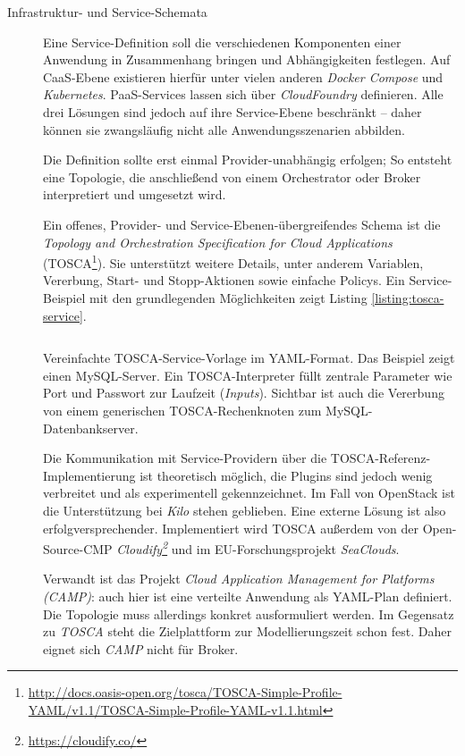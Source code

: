 \begin{description}
	\item[Infrastruktur- und Service-Schemata] Eine Service-Definition soll die verschiedenen Komponenten einer Anwendung in Zusammenhang bringen und Abhängigkeiten festlegen. Auf CaaS-Ebene existieren hierfür unter vielen anderen \emph{Docker Compose} und \emph{Kubernetes}. PaaS-Services lassen sich über \emph{CloudFoundry} definieren. Alle drei Lösungen sind jedoch auf ihre Service-Ebene beschränkt -- daher können sie zwangsläufig nicht alle Anwendungsszenarien abbilden.
	
	Die Definition sollte erst einmal Provider-unabhängig erfolgen; So entsteht eine Topologie, die anschließend von einem Orchestrator oder Broker interpretiert und umgesetzt wird.
	
	Ein offenes, Provider- und Service-Ebenen-übergreifendes Schema ist die \emph{Topology and Orchestration Specification for Cloud Applications} (TOSCA\footnote{\url{http://docs.oasis-open.org/tosca/TOSCA-Simple-Profile-YAML/v1.1/TOSCA-Simple-Profile-YAML-v1.1.html}}). Sie unterstützt	weitere Details, unter anderem Variablen, Vererbung, Start- und Stopp-Aktionen sowie einfache Policys. Ein Service-Beispiel mit den grundlegenden Möglichkeiten zeigt Listing \ref{listing:tosca-service}.
	
	
	\begin{listing}[]	
		\inputminted[]{yaml}{./src/TOSCA.service.sample.yaml}
		\caption{Vereinfachte TOSCA-Service-Vorlage im YAML-Format. Das Beispiel zeigt einen MySQL-Server. Ein TOSCA-Interpreter füllt zentrale Parameter wie Port und Passwort zur Laufzeit (\emph{Inputs}). Sichtbar ist auch die Vererbung von einem generischen TOSCA-Rechenknoten zum MySQL-Datenbankserver.}
		\label{listing:tosca-service}
	\end{listing}
	
	Die Kommunikation mit Service-Providern über die TOSCA-Referenz-Implementierung ist theoretisch möglich, die Plugins sind jedoch wenig verbreitet und als experimentell gekennzeichnet. Im Fall von OpenStack ist die Unterstützung bei \emph{Kilo} stehen geblieben. Eine externe Lösung ist also erfolgversprechender. Implementiert wird TOSCA außerdem von der Open-Source-CMP \emph{Cloudify\footnote{\url{https://cloudify.co/}}} und im EU-Forschungsprojekt \emph{SeaClouds}.
	
	Verwandt ist das Projekt \emph{Cloud Application Management for Platforms (CAMP)}: auch hier ist eine verteilte Anwendung als YAML-Plan definiert. Die Topologie muss allerdings konkret ausformuliert werden. Im Gegensatz zu \emph{TOSCA} steht die Zielplattform zur Modellierungszeit schon fest. Daher eignet sich \emph{CAMP} nicht für Broker.
	

\end{description}

